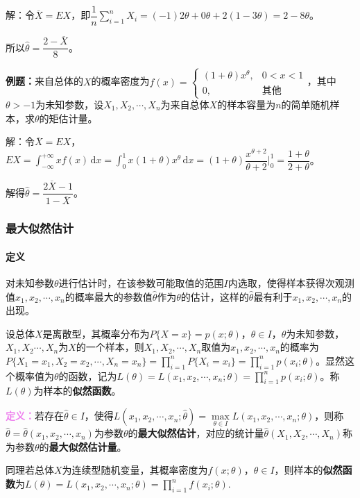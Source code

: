 解：令$\overline{X}=EX$，即$\dfrac{1}{n}\sum\limits_{i=1}^nX_i=(-1)2\theta+0\theta+2(1-3\theta)=2-8\theta$。

所以$\hat{\theta}=\dfrac{2-\overline{X}}{8}$。

\textbf{例题：}来自总体的$X$的概率密度为$f(x)=\left\{\begin{array}{ll}
    (1+\theta)x^\theta, & 0<x<1 \\
    0, & \text{其他}
\end{array}\right.$，其中$\theta>-1$为未知参数，设$X_1,X_2,\cdots,X_n$为来自总体$X$的样本容量为$n$的简单随机样本，求$\theta$的矩估计量。

解：令$\overline{X}=EX$，$EX=\int_{-\infty}^{+\infty}xf(x)\,\textrm{d}x=\int_0^1x(1+\theta)x^\theta\,\textrm{d}x=(1+\theta)\dfrac{x^{\theta+2}}{\theta+2}\bigg|_0^1=\dfrac{1+\theta}{2+\theta}$。

解得$\hat{\theta}=\dfrac{2\overline{X}-1}{1-\overline{X}}$。

\subsubsection{最大似然估计}

\paragraph{定义} \leavevmode \medskip

对未知参数$\theta$进行估计时，在该参数可能取值的范围$I$内选取，使得样本获得次观测值$x_1,x_2,\cdots,x_n$的概率最大的参数值$\hat{\theta}$作为$\theta$的估计，这样的$\hat{\theta}$最有利于$x_1,x_2,\cdots,x_n$的出现。

设总体$X$是离散型，其概率分布为$P\{X=x\}=p(x;\theta)$，$\theta\in I$，$\theta$为未知参数，$X_1,X_2\cdots,X_n$为$X$的一个样本，则$X_1,X_2,\cdots,X_n$取值为$x_1,x_2,\cdots,x_n$的概率为$P\{X_1=x_1,X_2=x_2,\cdots,X_n=x_n\}=\prod\limits_{i=1}^nP\{X_i=x_i\}=\prod\limits_{i=1}^np(x_i;\theta)$。显然这个概率值为$\theta$的函数，记为$L(\theta)=L(x_1,x_2,\cdots,x_n;\theta)=\prod\limits_{i=1}^np(x_i;\theta)$。称$L(\theta)$为样本的\textbf{似然函数}。

\textcolor{violet}{\textbf{定义：}}若存在$\hat{\theta}\in I$，使得$L(x_1,x_2,\cdots,x_n;\hat{\theta})=\max\limits_{\theta\in I}L(x_1,x_2,\cdots,x_n;\theta)$，则称$\hat{\theta}=\hat{\theta}(x_1,x_2,\cdots,x_n)$为参数$\theta$的\textbf{最大似然估计}，对应的统计量$\hat{\theta}(X_1,X_2,\cdots,X_n)$称为参数$\theta$的\textbf{最大似然估计量}。

同理若总体$X$为连续型随机变量，其概率密度为$f(x;\theta)$，$\theta\in I$，则样本的\textbf{似然函数}为$L(\theta)=L(x_1,x_2,\cdots,x_n;\theta)=\prod\limits_{i=1}^nf(x_i;\theta)$.

